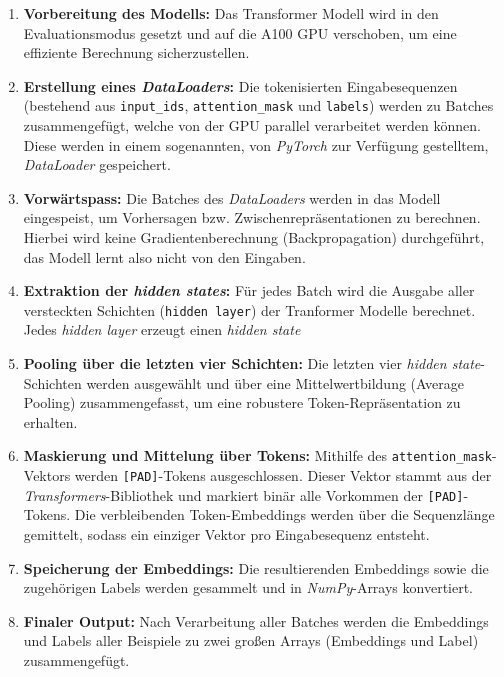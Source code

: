 \begin{enumerate}
  \item \textbf{Vorbereitung des Modells:}  
  Das Transformer Modell wird in den Evaluationsmodus gesetzt und auf die A100 GPU verschoben, um eine effiziente Berechnung sicherzustellen.

  \item \textbf{Erstellung eines \textit{DataLoaders}:}  
    Die tokenisierten Eingabesequenzen (bestehend aus \texttt{input\_ids}, \texttt{attention\_mask} und \texttt{labels}) werden zu Batches zusammengefügt,
    welche von der GPU parallel verarbeitet werden können. Diese werden in einem sogenannten, von \textit{PyTorch} zur Verfügung gestelltem, \textit{DataLoader} gespeichert.

  \item \textbf{Vorwärtspass:}  
  Die Batches des \textit{DataLoaders} werden in das Modell eingespeist, um Vorhersagen bzw. Zwischenrepräsentationen zu berechnen.
  Hierbei wird keine Gradientenberechnung (Backpropagation) durchgeführt, das Modell lernt also nicht von den Eingaben.

  \item \textbf{Extraktion der \textit{hidden states}:}  
  Für jedes Batch wird die Ausgabe aller versteckten Schichten (\texttt{hidden layer}) der Tranformer Modelle berechnet. 
  Jedes \textit{hidden layer} erzeugt einen \textit{hidden state}

  \item \textbf{Pooling über die letzten vier Schichten:}  
  Die letzten vier \textit{hidden state}-Schichten werden ausgewählt und über eine Mittelwertbildung (Average Pooling) zusammengefasst, 
  um eine robustere Token-Repräsentation zu erhalten.

  \item \textbf{Maskierung und Mittelung über Tokens:}  
  Mithilfe des \texttt{attention\_mask}-Vektors werden \texttt{[PAD]}-Tokens ausgeschlossen. Dieser Vektor stammt aus der \textit{Transformers}-Bibliothek und markiert binär
  alle Vorkommen der \texttt{[PAD]}-Tokens.
  Die verbleibenden Token-Embeddings werden über die Sequenzlänge gemittelt, sodass ein einziger Vektor pro Eingabesequenz entsteht.

  \item \textbf{Speicherung der Embeddings:}  
  Die resultierenden Embeddings sowie die zugehörigen Labels werden gesammelt und in \textit{NumPy}-Arrays konvertiert.

  \item \textbf{Finaler Output:}  
  Nach Verarbeitung aller Batches werden die Embeddings und Labels aller Beispiele zu zwei großen Arrays (Embeddings und Label) zusammengefügt.
\end{enumerate}

